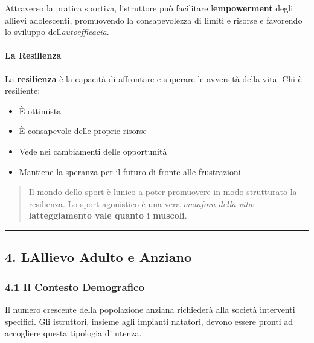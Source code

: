 \documentclass[a4paper,11pt]{article}
\providecommand{\tightlist}{%
  \setlength{\itemsep}{0pt}\setlength{\parskip}{0pt}}
\begin{document}
Attraverso la pratica sportiva, l\textquotesingle istruttore può
facilitare l\textquotesingle{}\textbf{empowerment} degli allievi
adolescenti, promuovendo la consapevolezza di limiti e risorse e
favorendo lo sviluppo dell\textquotesingle{}\emph{autoefficacia}.

\paragraph{La Resilienza}\label{la-resilienza}

La \textbf{resilienza} è la capacità di affrontare e superare le
avversità della vita. Chi è resiliente:

\begin{itemize}
      \tightlist
      \item
            È ottimista
      \item
            È consapevole delle proprie risorse
      \item
            Vede nei cambiamenti delle opportunità
      \item
            Mantiene la speranza per il futuro di fronte alle frustrazioni
\end{itemize}

\begin{quote}
      Il mondo dello sport è l\textquotesingle unico a poter promuovere in
      modo strutturato la resilienza. Lo sport agonistico è una vera
      \emph{metafora della vita}: \textbf{l\textquotesingle atteggiamento vale
            quanto i muscoli}.
\end{quote}

\begin{center}\rule{0.5\linewidth}{0.5pt}\end{center}

\subsection{4. L\textquotesingle Allievo Adulto e
      Anziano}\label{lallievo-adulto-e-anziano}

\subsubsection{4.1 Il Contesto
      Demografico}\label{il-contesto-demografico}

Il numero crescente della popolazione anziana richiederà alla società
interventi specifici. Gli istruttori, insieme agli impianti natatori,
devono essere pronti ad accogliere questa tipologia di utenza.
\end{document}
